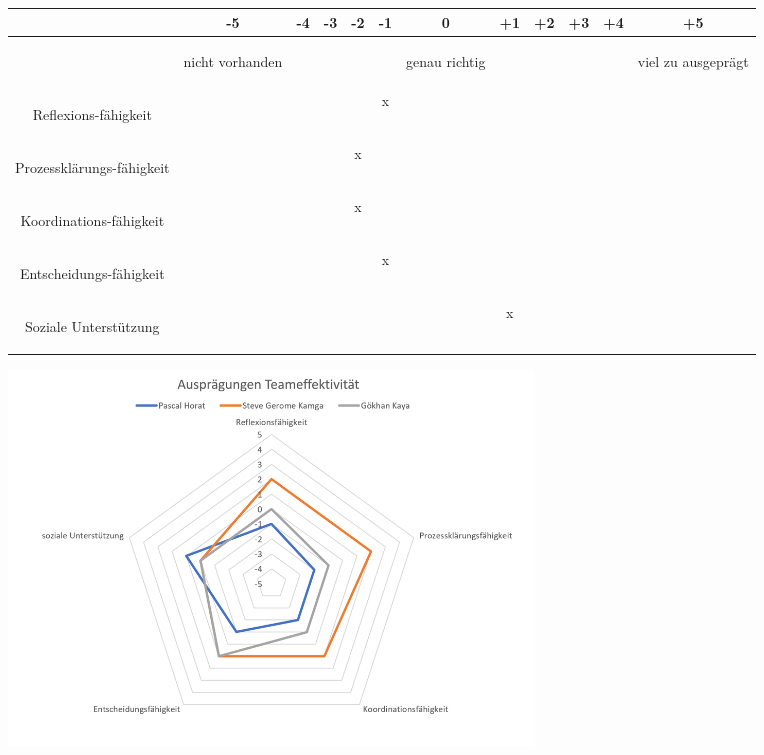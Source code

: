 \begin{tabular}{C{\fabstand}|C{\abstand}|C{\abstand}|C{\abstand}|C{\abstand}|C{\abstand}|C{\abstand}|C{\abstand}|C{\abstand}|C{\abstand}|C{\abstand}|C{\abstand}|}
\hline
& -5 & -4 & -3 & -2 & -1 & 0 & +1 & +2 & +3 & +4 & +5\\
\hline
&\begin{tiny}nicht vorhanden \end{tiny}& & & & & \begin{tiny}genau richtig \end{tiny}& & & & & \begin{tiny}viel zu ausgeprägt\end{tiny}\\
\hline
\begin{tiny} Reflexions-fähigkeit \end{tiny} & & & & & x & & & & & & \\
\hline
\begin{tiny} Prozessklärungs-fähigkeit \end{tiny}& & & & x & & & & & & & \\
\hline
\begin{tiny} Koordinations-fähigkeit \end{tiny}& & & & x & & & & & & & \\
\hline
\begin{tiny} Entscheidungs-fähigkeit \end{tiny}& & & & & x & & & & & & \\
\hline
\begin{tiny} Soziale Unterstützung \end{tiny}& & & & & & & x & & & & \\
\hline
\end{tabular}

\includegraphics[height=10cm]{images/AuspraegungenTeameffektivitaet.png}


